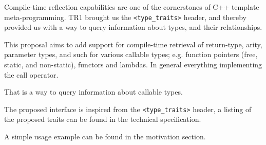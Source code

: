 Compile-time reflection capabilities are one of the cornerstones of C++ template
meta-programming. TR1 brought us the \verb|<type_traits>| header, and thereby
provided us with a way to query information about types, and their relationships.

This proposal aims to add support for compile-time retrieval of return-type,
arity, parameter types, and such for various callable types; e.g. function
pointers (free, static, and non-static), functors and lambdas. In general
everything implementing the call operator.

That is a way to query information about callable types.

The proposed interface is inspired from the \verb|<type_traits>| header, a
listing of the proposed traits can be found in the technical specification.

A simple usage example can be found in the motivation section.
